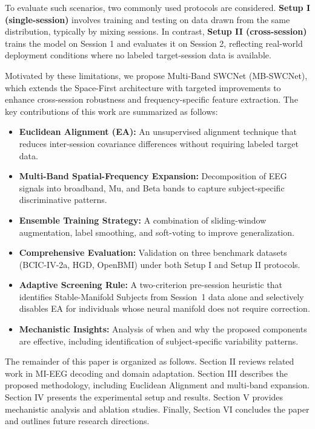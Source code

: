 \documentclass[conference]{IEEEtran}
\begin{document}
To evaluate such scenarios, two commonly used protocols are considered. \textbf{Setup I (single-session)} involves training and testing on data drawn from the same distribution, typically by mixing sessions. In contrast, \textbf{Setup II (cross-session)} trains the model on Session 1 and evaluates it on Session 2, reflecting real-world deployment conditions where no labeled target-session data is available.

Motivated by these limitations, we propose Multi-Band SWCNet (MB-SWCNet), which extends the Space-First architecture with targeted improvements to enhance cross-session robustness and frequency-specific feature extraction. The key contributions of this work are summarized as follows:

\begin{itemize}
    \item \textbf{Euclidean Alignment (EA):} An unsupervised alignment technique that reduces inter-session covariance differences without requiring labeled target data.
    \item \textbf{Multi-Band Spatial-Frequency Expansion:} Decomposition of EEG signals into broadband, Mu, and Beta bands to capture subject-specific discriminative patterns.
    \item \textbf{Ensemble Training Strategy:} A combination of sliding-window augmentation, label smoothing, and soft-voting to improve generalization.
    \item \textbf{Comprehensive Evaluation:} Validation on three benchmark datasets (BCIC-IV-2a, HGD, OpenBMI) under both Setup I and Setup II protocols.
    \item \textbf{Adaptive Screening Rule:} A two-criterion pre-session heuristic that identifies Stable-Manifold Subjects from Session~1 data alone and selectively disables EA for individuals whose neural manifold does not require correction.
    \item \textbf{Mechanistic Insights:} Analysis of when and why the proposed components are effective, including identification of subject-specific variability patterns.
\end{itemize}

The remainder of this paper is organized as follows. Section II reviews related work in MI-EEG decoding and domain adaptation. Section III describes the proposed methodology, including Euclidean Alignment and multi-band expansion. Section IV presents the experimental setup and results. Section V provides mechanistic analysis and ablation studies. Finally, Section VI concludes the paper and outlines future research directions.
\end{document}
